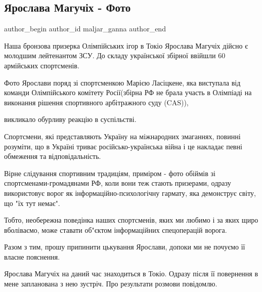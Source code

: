  
 
 
 
 
 
\subsection{Ярослава Магучіх - Фото}
\label{sec:08_08_2021.fb.maljar_ganna.1.maguchih_foto}
 
\ifcmt
 author_begin
   author_id maljar_ganna
 author_end
\fi

Наша бронзова призерка Олімпійських ігор в Токіо Ярослава Магучіх дійсно є
молодшим лейтенантом ЗСУ. До складу української збірної ввійшли 60 армійських
спортсменів. 

Фото Ярослави поряд зі спортсменкою Марією Ласіцкене, яка виступала від команди
Олімпійського комітету Росії(збірна  РФ не брала участь в Олімпіаді на
виконання рішення спортивного арбітражного суду (CAS)), 

викликало обурливу реакцію в суспільстві. 

Спортсмени, які представляють Україну на міжнародних змаганнях, повинні
розуміти, що в Україні триває російсько-українська війна і це накладає  певні
обмеження та відповідальність. 

Вірне слідування спортивним традиціям, приміром - фото обіймів зі
спортсменами-громадянами РФ, коли вони теж стають призерами, одразу
використовує ворог як  інформаційно-психологічну гармату, яка демонструє світу,
що "їх тут немає".  

Тобто, необережна поведінка наших спортсменів, яких ми любимо і за яких щиро
вболіваємо, може ставати об"єктом інформаційних спецоперацій ворога.  

Разом з тим, прошу припинити цькування Ярослави, допоки ми не почуємо її власне
пояснення. 

Ярослава Магучіх на даний час знаходиться в Токіо. Одразу після її повернення в
мене запланована з нею зустріч. Про результати розмови повідомлю.
